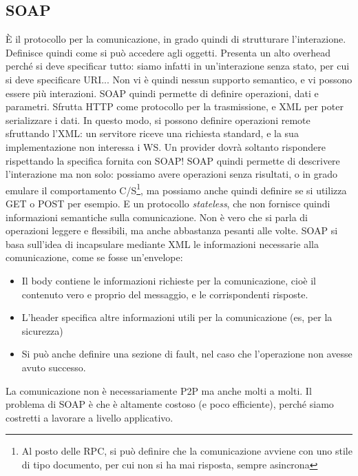\subsection{SOAP}
È il protocollo per la comunicazione, in grado quindi di strutturare l'interazione.
Definisce quindi come si può accedere agli oggetti. Presenta un alto overhead perché si deve specificar tutto: siamo
infatti in un'interazione senza stato, per cui si deve specificare URI... Non vi è quindi nessun supporto semantico,
e vi possono essere più interazioni.
SOAP quindi permette di definire operazioni, dati e parametri. Sfrutta HTTP come protocollo per la trasmissione, e XML
per poter serializzare i dati.
In questo modo, si possono definire operazioni remote sfruttando l'XML: un servitore riceve una richiesta standard, e
la sua implementazione non interessa i WS. Un provider dovrà soltanto rispondere rispettando la specifica fornita con
SOAP! SOAP quindi permette di descrivere l'interazione ma non solo: possiamo avere operazioni senza risultati, o in
grado emulare il comportamento C/S\footnote{Al posto delle RPC, si può definire che la comunicazione avviene con uno
stile di tipo documento, per cui non si ha mai risposta, sempre asincrona}, ma possiamo anche quindi definire se si
utilizza GET o POST per esempio. E un protocollo \textit{stateless}, che non fornisce quindi informazioni semantiche
sulla comunicazione. Non è vero che si parla di operazioni leggere e flessibili, ma anche abbastanza pesanti alle volte.
SOAP si basa sull'idea di incapsulare mediante XML le informazioni necessarie alla comunicazione, come se fosse
un'envelope:
\begin{itemize}
 \item Il body contiene le informazioni richieste per la comunicazione, cioè il contenuto vero e proprio del
 messaggio, e le corrispondenti risposte.
 \item L'header specifica altre informazioni utili per la comunicazione (es, per la sicurezza)
 \item Si può anche definire una sezione di fault, nel caso che l'operazione non avesse avuto successo.
\end{itemize}
La comunicazione non è necessariamente P2P ma anche molti a molti. Il problema di SOAP è che è altamente costoso (e
poco efficiente), perché siamo costretti a lavorare a livello applicativo.
